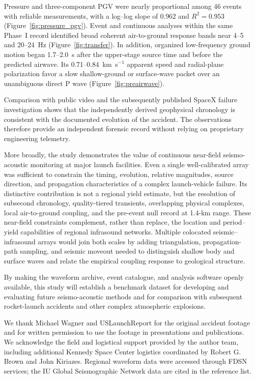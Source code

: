 \documentclass[]{seismica}
\begin{document}
Pressure and three-component PGV were nearly proportional among 46 events with
reliable measurements, with a log--log slope of 0.962 and $R^2=0.953$
(Figure~\ref{fig:pressure_pgv}). Event and continuous analyses within the same
Phase~I record identified broad coherent air-to-ground response bands near
4--5 and 20--24~Hz (Figure~\ref{fig:transfer}). In addition, organized
low-frequency ground motion began 1.7--2.0~s after the upper-stage source time
and before the predicted airwave. Its 0.71--0.84~km~s$^{-1}$ apparent speed and
radial-plane polarization favor a slow shallow-ground or surface-wave packet
over an unambiguous direct P wave (Figure~\ref{fig:preairwave}).

Comparison with public video and the subsequently published SpaceX failure investigation shows that the independently derived geophysical chronology is consistent with the documented evolution of the accident. The observations therefore provide an independent forensic record without relying on proprietary engineering telemetry.

More broadly, the study demonstrates the value of continuous near-field
seismo-acoustic monitoring at major launch facilities. Even a single
well-calibrated array was sufficient to constrain the timing, evolution,
relative magnitudes, source direction, and propagation characteristics of a
complex launch-vehicle failure. Its distinctive contribution is not a regional
yield estimate, but the resolution of subsecond chronology, quality-tiered
transients, overlapping physical complexes, local air-to-ground coupling, and
the pre-event null record at 1.4-km range. These near-field constraints
complement, rather than replace, the location and period--yield capabilities of
regional infrasound networks. Multiple colocated seismic--infrasound arrays
would join both scales by adding triangulation, propagation-path sampling, and
seismic moveout needed to distinguish shallow body and surface waves and relate
the empirical coupling response to geological structure.

By making the waveform archive, event catalogue, and analysis software openly available, this study will establish a benchmark dataset for developing and evaluating future seismo-acoustic methods and for comparison with subsequent rocket-launch accidents and other complex atmospheric explosions.

\begin{acknowledgements}
We thank Michael Wagner and USLaunchReport for the original accident footage
and for written permission to use the footage in presentations and
publications. We acknowledge the field and logistical support provided by the
author team, including additional Kennedy Space Center logistics coordinated
by Robert G. Brown and John Kiriazes. Regional waveform data were accessed
through FDSN services; the IU Global Seismographic Network data are cited in
the reference list.
\end{acknowledgements}
\end{document}
